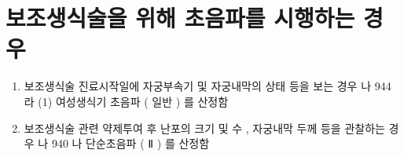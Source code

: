 \section{보조생식술을 위해 초음파를 시행하는 경우} 
\begin{enumerate}[1)]\tightlist
\item 보조생식술 진료시작일에 자궁부속기 및 자궁내막의 상태  등을 보는 경우 나 944 라 (1)  여성생식기 초음파 ( 일반 ) 를 산정함 
\item 보조생식술 관련 약제투여 후 난포의 크기 및 수 ,  자궁내막 두께 등을 관찰하는 경우 나 940 나 단순초음파 ( Ⅱ ) 를 산정함 
\end{enumerate}